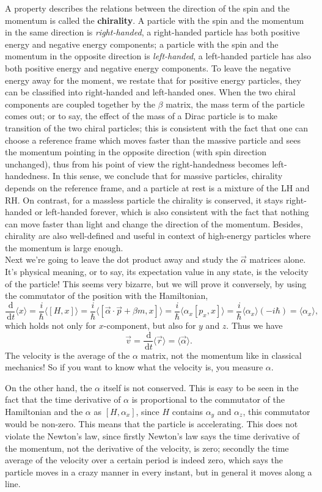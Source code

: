 \documentclass{article}
\newcommand{\be}{\begin{equation}}
\newcommand{\ee}{\end{equation}}
\newcommand{\dif}{\,\mathrm{d}}
\renewcommand{\1}{\left}
\renewcommand{\2}{\right}
\newcommand{\la}{\langle}
\newcommand{\ra}{\rangle}
\newcommand{\al}{\alpha}
\newcommand{\bet}{\beta}
\begin{document}
A property describes the relations between the direction of the spin and the momentum is called the \textbf{chirality}. A particle with the spin and the momentum in the same direction is \textit{right-handed}, a right-handed particle has both positive energy and negative energy components; a particle with the spin and the momentum in the opposite direction is \textit{left-handed}, a left-handed particle has also both positive energy and negative energy components. To leave the negative energy away for the moment, we restate that for positive energy particles, they can be classified into right-handed and left-handed ones. When the two chiral components are coupled together by the $\bet$ matrix, the mass term of the particle comes out; or to say, the effect of the mass of a Dirac particle is to make transition of the two chiral particles; this is consistent with the fact that one can choose a reference frame which moves faster than the massive particle and sees the momentum pointing in the opposite direction (with spin direction unchanged), thus from his point of view the right-handedness becomes left-handedness. In this sense, we conclude that for massive particles, chirality depends on the reference frame, and a particle at rest is a mixture of the LH and RH. On contrast, for a massless particle the chirality is conserved, it stays right-handed or left-handed forever, which is also consistent with the fact that nothing can move faster than light and change the direction of  the momentum. Besides, chirality are also well-defined and useful in context of high-energy particles where the momentum is large enough.\\

Next we're going to leave the dot product away and study the $\vec\al$ matrices alone. It's physical meaning, or to say, its expectation value in any state, is the velocity of the particle! This seems very bizarre, but we will prove it conversely, by using the commutator of the position with the Hamiltonian,
\be
\frac{\dif}{\dif t}{\la x\ra}=\frac i \hbar \la[H,x]\ra=\frac i \hbar\la[\vec\al\cdot\vec p+\bet m, x]\ra=\frac i \hbar \la\al_x[p_x,x]\ra=\frac i \hbar \la\al_x\ra (-i\hbar)=\la\al_x\ra,
\ee
which holds not only for $x$-component, but also for $y$ and $z$. Thus we have
\be
\vec v=\frac{\dif}{\dif t}{\la \vec r\ra}=\la\vec\al\ra.
\ee
The velocity is the average of the $\al$ matrix, not the momentum like in classical mechanics! So if you want to know what the velocity is, you measure $\al$.

On the other hand, the $\al$ itself is not conserved. This is easy to be seen in the fact that the time derivative of $\al$ is proportional to the commutator of the Hamiltonian and the $\al$ as $[H,\al_x]$, since $H$ contains $\al_y$ and $\al_z$, this commutator would be non-zero. This means that the particle is accelerating. This does not violate the Newton's law, since firstly Newton's law says the time derivative of the momentum, not the derivative of the velocity, is zero; secondly the time average of the velocity over a certain period is indeed zero, which says the particle moves in a crazy manner in every instant, but in general it moves along a line.
\end{document}
